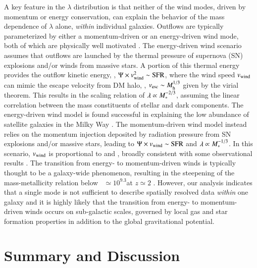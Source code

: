 A key feature in the $\lambda$ distribution is that neither of the wind modes, driven by momentum or energy conservation, can 
explain the behavior of the mass dependence of $\lambda$ alone, {\em within} individual galaxies.
Outflows are typically parameterized by either a momentum-driven \citep{Oppenheimer:2006eq,Oppenheimer:2008bu} or an
energy-driven \citep{Springel:2003eg} wind mode, both of which are physically well motivated \citep{Murray:2005jt}.
The energy-driven wind scenario assumes that outflows are launched by the thermal pressure of supernova (SN) explosions and/or
winds from massive stars.
A portion of this thermal energy provides the outflow kinetic energy, \ie, $\Psi\times v^2_{\rm wind} \sim {\rm SFR}$, where the wind 
speed $v_{\rm wind}$ can mimic the escape velocity from DM halo, \ie, $v_{\rm esc}\sim M_{\rm h}^{1/3}$ given by the virial 
theorem.
This results in the scaling relation of $\lambda\propto M_\ast^{-2/3}$, assuming the linear correlation between the mass 
constituents of stellar and dark components.
The energy-driven wind model is found successful in explaining the low abundance of satellite galaxies in the Milky Way 
\citep{Okamoto:2010ba}.
The momentum-driven wind model instead relies on the momentum injection deposited by radiation pressure from SN explosions and/or 
massive stars, leading to $\Psi\times v_{\rm wind} \sim {\rm SFR}$ and $\lambda\propto M_\ast^{-1/3}$.
In this scenario, $v_{\rm wind}$ is proportional to \Mstar and \SFR, broadly consistent with some observational
results \citep{Martin:2005kx}.
The transition from energy- to momentum-driven winds is typically thought to be a galaxy-wide phenomenon,
resulting in the steepening of the mass-metallicity relation below \Mstar~$\simeq10^{9.3}$\Msun at $z\simeq2$ 
\citep{Henry:2013gx}.
However, our analysis indicates that a single mode is not sufficient to describe spatially resolved data \emph{within} one galaxy 
and it is highly likely that the transition from energy- to momentum-driven winds occurs on sub-galactic scales, governed by local 
gas and star formation properties in addition to the global gravitational potential.


\section{Summary and Discussion}\label{sect:conclu}

